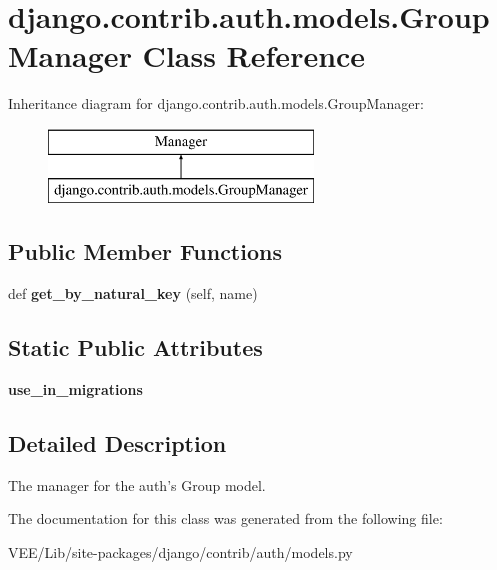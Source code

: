 \hypertarget{classdjango_1_1contrib_1_1auth_1_1models_1_1_group_manager}{}\section{django.\+contrib.\+auth.\+models.\+Group\+Manager Class Reference}
\label{classdjango_1_1contrib_1_1auth_1_1models_1_1_group_manager}
Inheritance diagram for django.\+contrib.\+auth.\+models.\+Group\+Manager\+:\begin{figure}[H]
\begin{center}
\leavevmode
\includegraphics[height=2.000000cm]{classdjango_1_1contrib_1_1auth_1_1models_1_1_group_manager}
\end{center}
\end{figure}
\subsection*{Public Member Functions}
\begin{DoxyCompactItemize}
\item 
\mbox{\label{classdjango_1_1contrib_1_1auth_1_1models_1_1_group_manager_ac5aa0a9d1d7a47a17c63690b16aa9bdb}} 
def {\bfseries get\+\_\+by\+\_\+natural\+\_\+key} (self, name)
\end{DoxyCompactItemize}
\subsection*{Static Public Attributes}
\begin{DoxyCompactItemize}
\item 
\mbox{\label{classdjango_1_1contrib_1_1auth_1_1models_1_1_group_manager_aa05000aafce02728f2cf56f20a4d5b77}} 
{\bfseries use\+\_\+in\+\_\+migrations}
\end{DoxyCompactItemize}


\subsection{Detailed Description}
\begin{DoxyVerb}The manager for the auth's Group model.
\end{DoxyVerb}
 

The documentation for this class was generated from the following file\+:\begin{DoxyCompactItemize}
\item 
V\+E\+E/\+Lib/site-\/packages/django/contrib/auth/models.\+py\end{DoxyCompactItemize}
